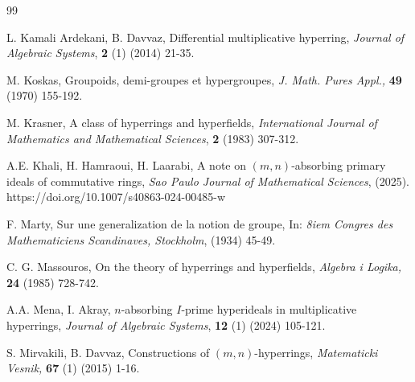 \documentclass[preprint,review,10pt]{amsart}
\theoremstyle{definition}
\theoremstyle{remark}
\numberwithin{equation}{section}
\begin{document}
\begin{thebibliography}{99}

 L. Kamali Ardekani, B. Davvaz, Differential multiplicative hyperring, {\it Journal of Algebraic Systems}, {\bf 2} (1) (2014) 21-35.
 

 
M. Koskas, Groupoids, demi-groupes et hypergroupes, {\it J. Math. Pures
Appl.,} {\bf 49} (1970) 155-192.
 
M. Krasner, A class of hyperrings and hyperﬁelds, {\it International Journal of Mathematics
and Mathematical Sciences}, {\bf 2} (1983) 307-312. 

A.E. Khali, H. Hamraoui, H. Laarabi, A note on $(m, n)$‑absorbing primary ideals of commutative rings, {\it Sao Paulo Journal of Mathematical Sciences},   (2025).  https://doi.org/10.1007/s40863-024-00485-w



F. Marty, Sur une generalization de la notion de groupe, In: {\it 8iem Congres des Mathematiciens Scandinaves, Stockholm}, (1934) 45-49.

C. G. Massouros, On the theory of hyperrings and hyperfields, {\it Algebra i Logika,} {\bf 24} (1985) 728-742.

A.A. Mena, I. Akray, $n$-absorbing $I$-prime hyperideals in multiplicative hyperrings, {\it Journal of Algebraic Systems}, {\bf 12} (1) (2024) 105-121.



S. Mirvakili, B. Davvaz, Constructions of $(m,n)$-hyperrings, {\it Matematicki Vesnik,} {\bf  67} (1) (2015) 1-16.




\end{thebibliography}
\end{document}
